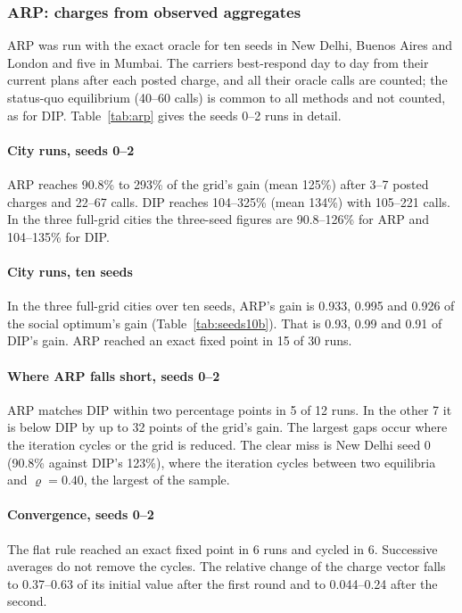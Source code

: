 \documentclass[preprint,11pt]{elsarticle}
\theoremstyle{definition}
\theoremstyle{remark}
\begin{document}
\subsubsection{ARP: charges from observed aggregates}\label{sec:res-arp}

ARP was run with the exact oracle for ten seeds in New Delhi, Buenos Aires and London and five in Mumbai. The carriers best-respond day to day from their current plans after each posted charge, and all their oracle calls are counted; the status-quo equilibrium (40--60 calls) is common to all methods and not counted, as for DIP. Table~\ref{tab:arp} gives the seeds 0--2 runs in detail.

\paragraph{City runs, seeds 0--2} ARP reaches 90.8\% to 293\% of the grid's gain (mean 125\%) after 3--7 posted charges and 22--67 calls. DIP reaches 104--325\% (mean 134\%) with 105--221 calls. In the three full-grid cities the three-seed figures are 90.8--126\% for ARP and 104--135\% for DIP.

\paragraph{City runs, ten seeds} In the three full-grid cities over ten seeds, ARP's gain is 0.933, 0.995 and 0.926 of the social optimum's gain (Table~\ref{tab:seeds10b}). That is 0.93, 0.99 and 0.91 of DIP's gain. ARP reached an exact fixed point in 15 of 30 runs.

\paragraph{Where ARP falls short, seeds 0--2} ARP matches DIP within two percentage points in 5 of 12 runs. In the other 7 it is below DIP by up to 32 points of the grid's gain. The largest gaps occur where the iteration cycles or the grid is reduced. The clear miss is New Delhi seed 0 (90.8\% against DIP's 123\%), where the iteration cycles between two equilibria and $\varrho=0.40$, the largest of the sample.

\paragraph{Convergence, seeds 0--2} The flat rule reached an exact fixed point in 6 runs and cycled in 6. Successive averages do not remove the cycles. The relative change of the charge vector falls to 0.37--0.63 of its initial value after the first round and to 0.044--0.24 after the second.
\end{document}

